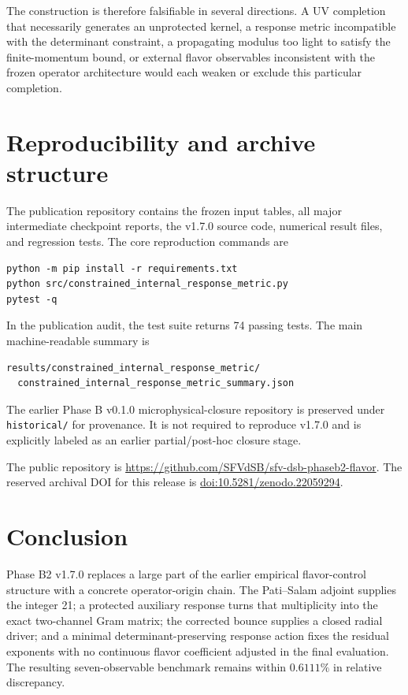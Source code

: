 \documentclass[11pt]{article}
\newcommand{\GitHubURL}{https://github.com/SFVdSB/sfv-dsb-phaseb2-flavor}
\newcommand{\ZenodoDOI}{10.5281/zenodo.22059294}
\begin{document}
The construction is therefore falsifiable in several directions. A UV completion that necessarily generates an unprotected kernel, a response metric incompatible with the determinant constraint, a propagating modulus too light to satisfy the finite-momentum bound, or external flavor observables inconsistent with the frozen operator architecture would each weaken or exclude this particular completion.

\section{Reproducibility and archive structure}

The publication repository contains the frozen input tables, all major intermediate checkpoint reports, the v1.7.0 source code, numerical result files, and regression tests. The core reproduction commands are
\begin{verbatim}
python -m pip install -r requirements.txt
python src/constrained_internal_response_metric.py
pytest -q
\end{verbatim}
In the publication audit, the test suite returns 74 passing tests. The main machine-readable summary is
\begin{verbatim}
results/constrained_internal_response_metric/
  constrained_internal_response_metric_summary.json
\end{verbatim}
The earlier Phase B v0.1.0 microphysical-closure repository is preserved under \texttt{historical/} for provenance. It is not required to reproduce v1.7.0 and is explicitly labeled as an earlier partial/post-hoc closure stage.

The public repository is \url{\GitHubURL}. The reserved archival DOI for this release is \href{https://doi.org/\ZenodoDOI}{doi:\ZenodoDOI}.

\section{Conclusion}

Phase B2 v1.7.0 replaces a large part of the earlier empirical flavor-control structure with a concrete operator-origin chain. The Pati--Salam adjoint supplies the integer 21; a protected auxiliary response turns that multiplicity into the exact two-channel Gram matrix; the corrected bounce supplies a closed radial driver; and a minimal determinant-preserving response action fixes the residual exponents with no continuous flavor coefficient adjusted in the final evaluation. The resulting seven-observable benchmark remains within $0.6111\%$ in relative discrepancy.
\end{document}
